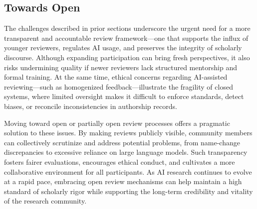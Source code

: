 % 


\subsection{Towards Open}

The challenges described in prior sections underscore the urgent need for a more transparent and accountable review framework—one that supports the influx of younger reviewers, regulates AI usage, and preserves the integrity of scholarly discourse. Although expanding participation can bring fresh perspectives, it also risks undermining quality if newer reviewers lack structured mentorship and formal training. At the same time, ethical concerns regarding AI-assisted reviewing—such as homogenized feedback—illustrate the fragility of closed systems, where limited oversight makes it difficult to enforce standards, detect biases, or reconcile inconsistencies in authorship records.

Moving toward open or partially open review processes offers a pragmatic solution to these issues. By making reviews publicly visible, community members can collectively scrutinize and address potential problems, from name-change discrepancies to excessive reliance on large language models. Such transparency fosters fairer evaluations, encourages ethical conduct, and cultivates a more collaborative environment for all participants. As AI research continues to evolve at a rapid pace, embracing open review mechanisms can help maintain a high standard of scholarly rigor while supporting the long-term credibility and vitality of the research community.

